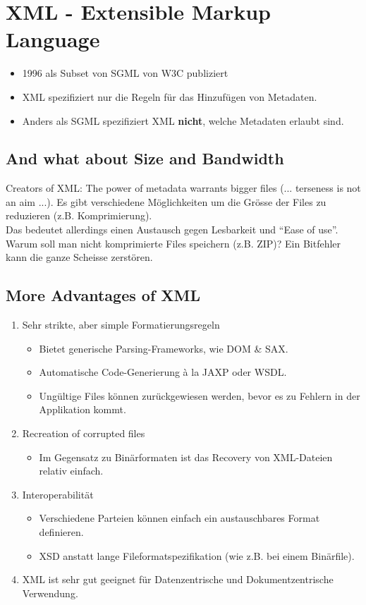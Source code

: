 \section{XML - Extensible Markup Language}
\begin{itemize}
\item 1996 als Subset von SGML von W3C publiziert
\item XML spezifiziert nur die Regeln für das Hinzufügen von Metadaten.
\item Anders als SGML spezifiziert XML \textbf{nicht}, welche Metadaten erlaubt sind.
\end{itemize}

\subsection{And what about Size and Bandwidth}
Creators of XML: The power of metadata warrants bigger files (... terseness is not an aim ...).
Es gibt verschiedene Möglichkeiten um die Grösse der Files zu reduzieren (z.B. Komprimierung).\\
Das bedeutet allerdings einen Austausch gegen Lesbarkeit und "`Ease of use"'.\\
Warum soll man nicht komprimierte Files speichern (z.B. ZIP)? Ein Bitfehler kann die ganze Scheisse zerstören.

\subsection{More Advantages of XML}
\begin{enumerate}
\item Sehr strikte, aber simple Formatierungsregeln
\begin{itemize}
\item Bietet generische Parsing-Frameworks, wie DOM \& SAX.
\item Automatische Code-Generierung à la JAXP oder WSDL.
\item Ungültige Files können zurückgewiesen werden, bevor es zu Fehlern in der Applikation kommt.
\end{itemize}
\item Recreation of corrupted files
\begin{itemize}
\item Im Gegensatz zu Binärformaten ist das Recovery von XML-Dateien relativ einfach.
\end{itemize}
\item Interoperabilität
\begin{itemize}
\item Verschiedene Parteien können einfach ein austauschbares Format definieren.
\item XSD anstatt lange Fileformatspezifikation (wie z.B. bei einem Binärfile).
\end{itemize}
\item XML ist sehr gut geeignet für Datenzentrische und Dokumentzentrische Verwendung.
\end{enumerate}

